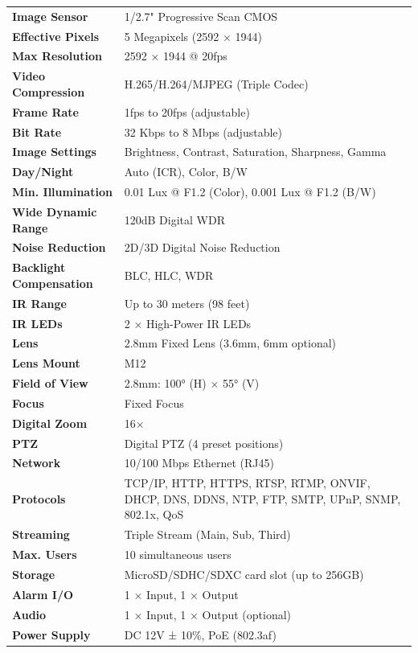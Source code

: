 \documentclass[11pt,a4paper]{article}
\begin{document}
{\begin{longtable}{@{}p{4cm}X@{}}
\textbf{Image Sensor} & 1/2.7" Progressive Scan CMOS \\
\textbf{Effective Pixels} & 5 Megapixels (2592 × 1944) \\
\textbf{Max Resolution} & 2592 × 1944 @ 20fps \\
\textbf{Video Compression} & H.265/H.264/MJPEG (Triple Codec) \\
\textbf{Frame Rate} & 1fps to 20fps (adjustable) \\
\textbf{Bit Rate} & 32 Kbps to 8 Mbps (adjustable) \\
\textbf{Image Settings} & Brightness, Contrast, Saturation, Sharpness, Gamma \\
\textbf{Day/Night} & Auto (ICR), Color, B/W \\
\textbf{Min. Illumination} & 0.01 Lux @ F1.2 (Color), 0.001 Lux @ F1.2 (B/W) \\
\textbf{Wide Dynamic Range} & 120dB Digital WDR \\
\textbf{Noise Reduction} & 2D/3D Digital Noise Reduction \\
\textbf{Backlight Compensation} & BLC, HLC, WDR \\
\textbf{IR Range} & Up to 30 meters (98 feet) \\
\textbf{IR LEDs} & 2 × High-Power IR LEDs \\
\textbf{Lens} & 2.8mm Fixed Lens (3.6mm, 6mm optional) \\
\textbf{Lens Mount} & M12 \\
\textbf{Field of View} & 2.8mm: 100° (H) × 55° (V) \\
\textbf{Focus} & Fixed Focus \\
\textbf{Digital Zoom} & 16× \\
\textbf{PTZ} & Digital PTZ (4 preset positions) \\
\textbf{Network} & 10/100 Mbps Ethernet (RJ45) \\
\textbf{Protocols} & TCP/IP, HTTP, HTTPS, RTSP, RTMP, ONVIF, DHCP, DNS, DDNS, NTP, FTP, SMTP, UPnP, SNMP, 802.1x, QoS \\
\textbf{Streaming} & Triple Stream (Main, Sub, Third) \\
\textbf{Max. Users} & 10 simultaneous users \\
\textbf{Storage} & MicroSD/SDHC/SDXC card slot (up to 256GB) \\
\textbf{Alarm I/O} & 1 × Input, 1 × Output \\
\textbf{Audio} & 1 × Input, 1 × Output (optional) \\
\textbf{Power Supply} & DC 12V ± 10\%, PoE (802.3af) \\

\end{longtable}}
\end{document}

